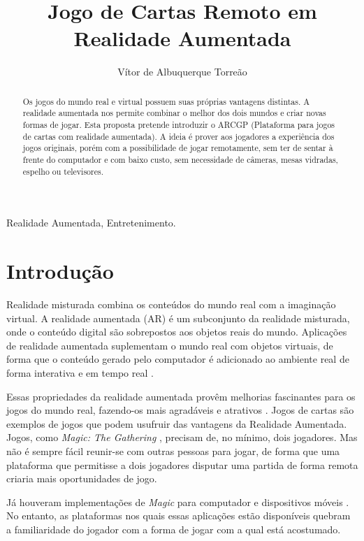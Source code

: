 \documentclass[conference]{IEEEtran}
\title{Jogo de Cartas Remoto em Realidade Aumentada}
\author{Vítor de Albuquerque Torreão}
\begin{document}
\maketitle

\begin{abstract}
	Os jogos do mundo real e virtual possuem suas próprias vantagens distintas. A 
	realidade aumentada nos permite combinar o melhor dos dois mundos e criar novas 
	formas de jogar. Esta proposta pretende introduzir o ARCGP (Plataforma para 
	jogos de cartas com realidade aumentada). A ideia é prover aos jogadores a 
	experiência dos jogos originais, porém com a possibilidade de jogar remotamente, 
	sem ter de sentar à frente do computador e com baixo custo, sem necessidade de 
	câmeras, mesas vidradas, espelho ou televisores.
\end{abstract}

\begin{IEEEkeywords}
	Realidade Aumentada, Entretenimento.
\end{IEEEkeywords}

\section{Introdução}
Realidade misturada combina os conteúdos do mundo real com a imaginação virtual.
A realidade aumentada (AR) é um subconjunto da realidade misturada, onde o 
conteúdo digital são sobrepostos aos objetos reais do mundo. Aplicações de 
realidade aumentada suplementam o mundo real com objetos virtuais, de forma que 
o conteúdo gerado pelo computador é adicionado ao ambiente real de forma 
interativa e em tempo real \cite{burdea2003virtual}.

Essas propriedades da realidade aumentada provêm melhorias fascinantes para os 
jogos do mundo real, fazendo-os mais agradáveis e atrativos 
\cite{Lam:2006:AAR:1128923.1128987}. Jogos de cartas são exemplos de jogos que 
podem usufruir das vantagens da Realidade Aumentada. Jogos, como \textit{Magic: 
The Gathering} \cite{magic}, precisam de, no mínimo, dois jogadores. Mas não é 
sempre fácil reunir-se com outras pessoas para jogar, de forma que uma 
plataforma que permitisse a dois jogadores disputar uma partida de forma 
remota criaria mais oportunidades de jogo.

Já houveram implementações de \textit{Magic} para computador e dispositivos 
móveis \cite{magic_duels}. No entanto, as plataformas nos quais essas 
aplicações estão disponíveis quebram  a familiaridade do jogador com a forma 
de jogar com a qual está acostumado.
\end{document}
